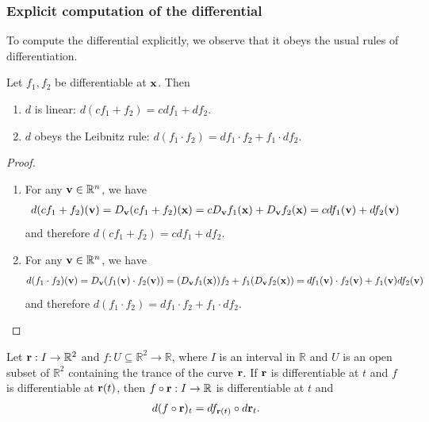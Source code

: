 \documentclass[12pt,letterpaper,reqno]{article}
\numberwithin{equation}{section}
\newcommand{\R}{\ensuremath{\mathbb R}}
\newcommand{\bv}{{\bf v}}
\newcommand{\bx}{{\bf x}}
\newcommand{\bbr}{{\bf r}}
\newcommand{\fixme}[1]{{\color{orange}{[#1]}}}
\begin{document}
{\subsubsection{Explicit computation of the differential}
To compute the differential explicitly, we observe that it obeys the usual rules of differentiation.

\begin{thm}\label{thm:algebraic_properties_of_the_differential}
Let $f_1,f_2$ be differentiable at $\bx$. Then
\begin{enumerate}[(1)]
	\item $d$ is linear: $d(cf_1+f_2)=cdf_1+df_2$.
	\item $d$ obeys the Leibnitz rule: $d(f_1 \cdot f_2)=df_1 \cdot f_2+f_1 \cdot df_2$.
\end{enumerate}	
\end{thm}

\begin{proof}
	\begin{enumerate}[(1)]
		\item For any $\bv \in \R^n$, we have
		\begin{align*}
			d(cf_1+f_2)(\bv)=D_\bv(cf_1+f_2)(\bx)=c D_\bv f_1(\bx)+D_\bv f_2(\bx)=cdf_1(\bv)+df_2(\bv)
		\end{align*}
		and therefore $d(cf_1+f_2)=cdf_1+df_2$.
		\item For any $\bv \in \R^n$, we have
		\begin{align*}
			d(f_1 \cdot f_2)(\bv)=D_\bv(f_1(\bv) \cdot f_2(\bv))=(D_\bv f_1(\bx))f_2+f_1(D_\bv f_2(\bx))=df_1(\bv)\cdot f_2(\bv)+f_1(\bv)df_2(\bv)
		\end{align*}
		and therefore $d(f_1 \cdot f_2)=df_1 \cdot f_2+f_1 \cdot df_2$.
	\end{enumerate}
\end{proof}

\begin{thm}
	Let $\bbr:I \to \R^2$ and $f:U \subseteq \R^2 \to \R$, where $I$ is an interval in $\R$ and $U$ is an open subset of $\R^2$ containing the trance of the curve $\bbr$. If $\bbr$ is differentiable at $t$ and $f$ is differentiable at $\bbr(t)$, then $f \circ \bbr:I \to \R$ is differentiable at $t$ and
	\begin{align*}
		d(f \circ \bbr)_{t}=df_{\bbr(t)} \circ d\bbr_t.
	\end{align*}
\end{thm}

\fixme{Draw a picture.}

}
\end{document}
